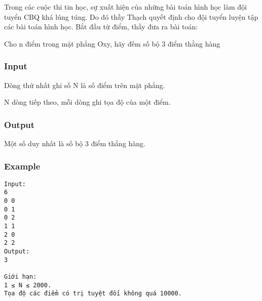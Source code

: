



   Trong các cuộc thi tin học, sự xuất hiện của những bài toán hình học làm đội tuyển CBQ khá lúng túng. Do đó thầy Thạch quyết định cho đội tuyển luyện tập các bài toán hình học. Bắt đầu từ điểm, thầy đưa ra bài toán:  

   Cho n điểm trong mặt phẳng Oxy, hãy đếm số bộ 3 điểm thằng hàng  

\subsubsection{   Input  }

   Dòng thứ nhất ghi số N là số điểm trên mặt phẳng.  

   N dòng tiếp theo, mỗi dòng ghi tọa độ của một điểm.  

\subsubsection{   Output  }

   Một số duy nhất là số bộ 3 điểm thẳng hàng.  

\subsubsection{   Example  }
\begin{verbatim}
Input:
6
0 0
0 1
0 2
1 1
2 0
2 2
Output:
3

Giới hạn:
1 ≤ N ≤ 2000.
Tọa độ các điểm có trị tuyệt đối không quá 10000.
\end{verbatim}